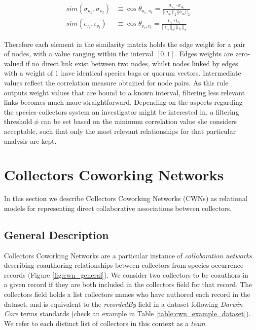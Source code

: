 \begin{equation}
\begin{split}
sim(\sigma_{u_s},\sigma_{u_t}) &\equiv
\cos \theta_{u_s,u_t} =
\frac{  \sigma_{u_s} \cdot \sigma_{u_t}  }{  ||\sigma_{u_s}||_2  ||\sigma_{u_t}||_2  } \\
sim(\iota_{v_s},\iota_{v_t}) &\equiv
\cos \theta_{v_s,v_t} =
\frac{  \iota_{v_s} \cdot \iota_{v_t}  }{  ||\iota_{v_s}||_2  ||\iota_{v_t}||_2  } 
\end{split}
\end{equation}

Therefore each element in the similarity matrix holds the edge weight for a pair of nodes, with a value ranging within the interval $[0,1]$. Edges weights are zero-valued if no direct link exist between two nodes,  whilst nodes linked by edges with a weight of $1$ have identical species bags or quorum vectors. Intermediate values reflect the correlation measure obtained for node pairs.
As this rule outputs weight values that are bound to a known interval, filtering less relevant links becomes much more straightforward. Depending on the aspects regarding the species-collectors system an investigator might be interested in, a filtering threshold $\phi$ can be set based on the minimum correlation value she considers acceptable, such that only the most relevant relationships for that particular analysis are kept.













\section{Collectors Coworking Networks}
In this section we describe Collectors Coworking Networks (CWNs) as relational models for representing direct collaborative associations between collectors.

\subsection{General Description}
Collectors Coworking Networks are a particular instance of \textit{collaboration networks} \cite{Ramasco2004} describing coauthoring relationships between collectors from species occurrence records (Figure \ref{fig:cwn_general}).
We consider two collectors to be coauthors in a given record if they are both included in the collectors field for that record. The collectors field holds a list collectors names who have authored each record in the dataset, and is equivalent to the \textit{recordedBy} field in a dataset following \textit{Darwin Core} terms standards (check an example in Table \ref{table:cwn_example_dataset}). We refer to each distinct list of collectors in this context as a \textit{team}.

